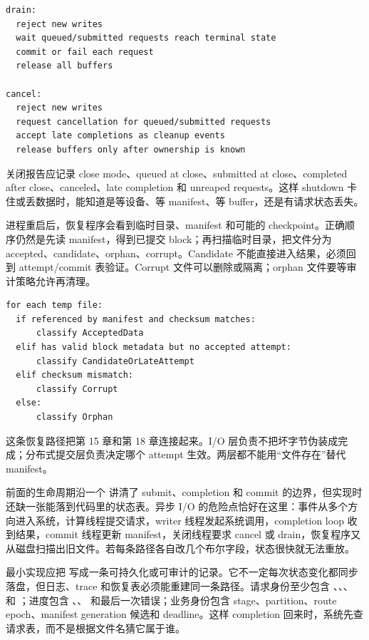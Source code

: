 \begin{lstlisting}[numbers=none,caption={I/O 关闭模式}]
drain:
  reject new writes
  wait queued/submitted requests reach terminal state
  commit or fail each request
  release all buffers

cancel:
  reject new writes
  request cancellation for queued/submitted requests
  accept late completions as cleanup events
  release buffers only after ownership is known
\end{lstlisting}

关闭报告应记录 close mode、queued at close、submitted at close、completed after close、canceled、late completion 和 unreaped requests。这样 shutdown 卡住或丢数据时，能知道是等设备、等 manifest、等 buffer，还是有请求状态丢失。

进程重启后，恢复程序会看到临时目录、manifest 和可能的 checkpoint。正确顺序仍然是先读 manifest，得到已提交 block；再扫描临时目录，把文件分为 accepted、candidate、orphan、corrupt。Candidate 不能直接进入结果，必须回到 attempt/commit 表验证。Corrupt 文件可以删除或隔离；orphan 文件要等审计策略允许再清理。

\begin{lstlisting}[numbers=none,caption={I/O 恢复扫描分类}]
for each temp file:
  if referenced by manifest and checksum matches:
      classify AcceptedData
  elif has valid block metadata but no accepted attempt:
      classify CandidateOrLateAttempt
  elif checksum mismatch:
      classify Corrupt
  else:
      classify Orphan
\end{lstlisting}

这条恢复路径把第 15 章和第 18 章连接起来。I/O 层负责不把坏字节伪装成完成；分布式提交层负责决定哪个 attempt 生效。两层都不能用“文件存在”替代 manifest。

前面的生命周期沿一个  讲清了 submit、completion 和 commit 的边界，但实现时还缺一张能落到代码里的状态表。异步 I/O 的危险点恰好在这里：事件从多个方向进入系统，计算线程提交请求，writer 线程发起系统调用，completion loop 收到结果，commit 线程更新 manifest，关闭线程要求 cancel 或 drain，恢复程序又从磁盘扫描出旧文件。若每条路径各自改几个布尔字段，状态很快就无法重放。

最小实现应把  写成一条可持久化或可审计的记录。它不一定每次状态变化都同步落盘，但日志、trace 和恢复表必须能重建同一条路径。请求身份至少包含 、、、 和 ；进度包含 、、 和最后一次错误；业务身份包含 stage、partition、route epoch、manifest generation 候选和 deadline。这样 completion 回来时，系统先查请求表，而不是根据文件名猜它属于谁。


